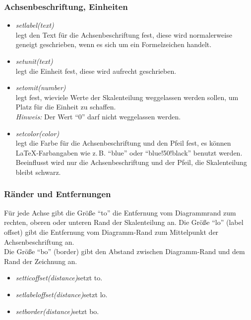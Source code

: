 \documentclass[ngerman,origlongtable]{scrartcl}
\begin{document}
\subsubsection{Achsenbeschriftung, Einheiten}
\begin{itemize}
\item	\textit{set\textunderscore{}label(text)\/}\\
legt den Text für die Achsenbeschriftung fest, diese wird normalerweise
geneigt geschrieben, wenn es sich um ein Formelzeichen handelt.
\item	\textit{set\textunderscore{}unit(text)\/}\\
legt die Einheit fest, diese wird aufrecht geschrieben.
\item	\textit{set\textunderscore{}omit(number)\/}\\
legt fest, wieviele Werte der Skalenteilung weggelassen werden sollen, um
Platz für die Einheit zu schaffen.\\
\emph{Hinweis:} Der Wert "`0"' darf nicht weggelassen werden.
\item	\textit{set\textunderscore{}color(color)\/}\\
legt die Farbe für die Achsenbeschriftung und den Pfeil fest, es können
\LaTeX{}-Farbangaben wie z.\,B. "`blue"' oder "`blue!50!black"'
benutzt werden.\\
Beeinflusst wird nur die Achsenbeschriftung und der Pfeil, die Skalenteilung
bleibt schwarz.
\end{itemize}
\clearpage
\subsubsection{Ränder und Entfernungen}
Für jede Achse gibt die Größe "`to"' die Entfernung vom Diagrammrand
zum rechten, oberen oder unteren Rand der Skalenteilung an.
Die Größe "`lo"' (label offset) gibt die Entfernung vom Diagramm-Rand zum
Mittelpunkt der Achsenbeschriftung an.\\
Die Größe "`bo"' (border) gibt den Abstand zwischen Diagramm-Rand und
dem Rand der Zeichnung an.
\begin{itemize}
\item	\textit{set\textunderscore{}tic\textunderscore{}offset(distance)\/}\hfill{}setzt to.
\item	\textit{set\textunderscore{}label\textunderscore{}offset(distance)\/}\hfill{}setzt lo.
\item	\textit{set\textunderscore{}border(distance)\/}\hfill{}setzt bo.
\end{itemize}
\clearpage
\end{document}
